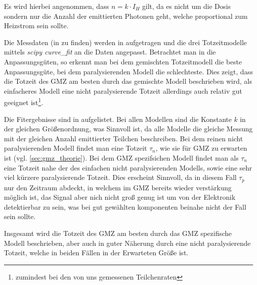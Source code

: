 Es wird hierbei angenommen, dass $n = k \cdot I_H$ gilt, da es nicht um die Dosis sondern nur die Anzahl der emittierten Photonen geht, welche proportional zum Heizstrom sein sollte.

Die Messdaten (in  zu finden) werden in  aufgetragen und die drei Totzeitmodelle mittels \textit{scipy curve\_fit} \cite{scipy} an die Daten angepasst. Betrachtet man in  die Anpassungsgüten, so erkennt man bei dem gemischten Totzeitmodell die beste Anpassungsgüte, bei dem paralysierenden Modell die schlechteste. Dies zeigt, dass die Totzeit des GMZ am besten durch das gemischte Modell beschrieben wird, als einfacheres Modell eine nicht paralysierende Totzeit allerdings auch relativ gut geeignet ist\footnote{zumindest bei den von uns gemessenen Teilchenraten}.


Die Fitergebnisse sind in  aufgelistet. Bei allen Modellen sind die Konstante $k$ in der gleichen Größenordnung, was Sinnvoll ist, da alle Modelle die gleiche Messung mit der gleichen Anzahl emittierter Teilchen beschreiben. Bei dem reinen nicht paralysierenden Modell findet man eine Totzeit $\tau_n$, wie sie für GMZ zu erwarten ist (vgl. \ref{sec:gmz_theorie}). Bei dem GMZ spezifsichen Modell findet man als $\tau_n$ eine Totzeit nahe der des einfachen nicht paralysierenden Modells, sowie eine sehr viel kürzere paralysierende Totzeit. Dies erscheint Sinnvoll, da in diesem Fall $\tau_p$ nur den Zeitraum abdeckt, in welchem im GMZ bereits wieder verstärkung möglich ist, das Signal aber nich nicht groß genug ist um von der Elektronik detektierbar zu sein, was bei gut gewählten komponenten beinahe nicht der Fall sein sollte.

Insgesamt wird die Totzeit des GMZ am besten durch das GMZ spezifische Modell beschrieben, aber auch in guter Näherung durch eine nicht paralysierende Totzeit, welche in beiden Fällen in der Erwarteten Größe ist.


